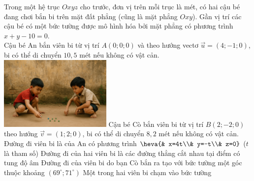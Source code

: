 \begin{ex}%
\immini
{
 Trong một hệ trục $Oxyz$ cho trước, đơn vị trên mỗi trục là mét, có hai cậu bé đang chơi bắn bi trên mặt đất phẳng (cũng là mặt phẳng $Oxy$). Gần vị trí các cậu bé có một bức tường được mô hình hóa bởi mặt phẳng có phương trình $x+y-10=0$.\\
Cậu bé An bắn viên bi từ vị trí $ A\left(0;0;0\right)$ và theo hướng vectơ $\vec{u}=\left(4;-1;0\right)$, bi có thể di chuyển $10{,}5$ mét nếu không có vật cản.
}
{
 \includegraphics[width=5.5cm]{img/HXN-12-14}
}
Cậu bé Cò bắn viên bi từ vị trí $B\left(2;-2;0\right)$ theo hướng $\vec{v}=\left(1;2;0\right)$, bi có thể di chuyển $8{,}2$ mét nếu không có vật cản.
\choiceTF
 {\True Đường đi viên bi là của An có phương trình $\heva{& x=4t\\& y=-t\\& z=0}$ ($t$ là tham số)}
{\True Đường đi của hai viên bi là các đường thẳng cắt nhau tại điểm có tung độ âm}
 {Đường đi của viên bi do bạn Cò bắn ra tạo với bức tường một góc thuộc khoảng $\left(69^{\circ};71^{\circ}\right)$}
 {\True Một trong hai viên bi chạm vào bức tường}
\end{ex}
